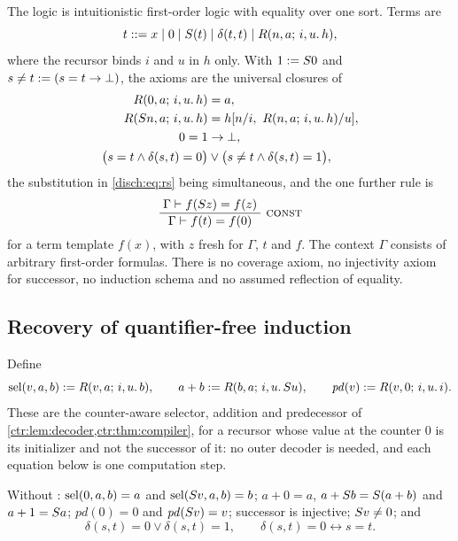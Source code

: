 \begin{definition}
\label{disch:def:const}
The logic is intuitionistic first-order logic with equality over one sort.
Terms are
\[
 t::=x\mid 0\mid S(t)\mid\delta(t,t)\mid R(n,a;\,i,u.\,h),
\]
where the recursor binds $i$ and $u$ in $h$ only. With $1\mathrel{:=}S 0$ and
$s\neq t\mathrel{:=}(s=t\to\bot)$, the axioms are the universal closures of
\begin{align}
 R(0,a;\,i,u.\,h)&=a, \label{disch:eq:r0}\\
 R(S n,a;\,i,u.\,h)&=h[n/i,\ R(n,a;\,i,u.\,h)/u], \label{disch:eq:rs}\\
 0=1&\to\bot, \label{disch:eq:sep}\\
 \bigl(s=t\land\delta(s,t)=0\bigr)&\lor
 \bigl(s\neq t\land\delta(s,t)=1\bigr), \label{disch:eq:split}
\end{align}
the substitution in \eqref{disch:eq:rs} being simultaneous, and the one
further rule is
\begin{equation}
 \infrule{\Gamma\proves f(\Suc z)=f(z)}{\Gamma\proves f(t)=f(0)}\
 \rulename{Const}
 \label{disch:eq:construle}
\end{equation}
for a term template $f(x)$, with $z$ fresh for $\Gamma$, $t$ and $f$. The
context $\Gamma$ consists of arbitrary first-order formulas. There is no
coverage axiom, no injectivity axiom for successor, no induction schema
and no assumed reflection of equality.
\end{definition}

\subsection{Recovery of quantifier-free induction}

Define
\[
 \operatorname{sel}(v,a,b)\mathrel{:=} R(v,a;\,i,u.\,b),\qquad
 a+b\mathrel{:=} R(b,a;\,i,u.\,S u),\qquad
 \mathit{pd}(v)\mathrel{:=} R(v,0;\,i,u.\,i).
\]
These are the counter-aware selector, addition and predecessor of
\cref{ctr:lem:decoder,ctr:thm:compiler}, for a recursor whose value at the
counter $0$ is its initializer and not the successor of it: no outer
decoder is needed, and each equation below is one computation step.

\begin{lemma}
\label{disch:lem:const-elem}
Without : $\operatorname{sel}(0,a,b)=a$ and $\operatorname{sel}(S v,a,b)=b$;
$a+0=a$, $a+S b=S(a+b)$ and $a+1=S a$; $\mathit{pd}(0)=0$ and
$\mathit{pd}(S v)=v$; successor is injective; $S v\neq 0$; and
\begin{equation}
 \delta(s,t)=0\lor\delta(s,t)=1,\qquad
 \delta(s,t)=0\leftrightarrow s=t .
 \label{disch:eq:deltabool}
\end{equation}
\end{lemma}

